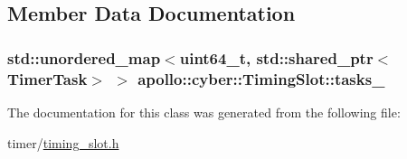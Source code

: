 \subsection{Member Data Documentation}
\hypertarget{classapollo_1_1cyber_1_1TimingSlot_a2cdde7cc5a017a2cd2816676133864e7}{
\subsubsection[{tasks\-\_\-}]{\setlength{\rightskip}{0pt plus 5cm}std\-::unordered\-\_\-map$<$uint64\-\_\-t, std\-::shared\-\_\-ptr$<${\bf Timer\-Task}$>$ $>$ apollo\-::cyber\-::\-Timing\-Slot\-::tasks\-\_\-\hspace{0.3cm}{\ttfamily [private]}}}\label{classapollo_1_1cyber_1_1TimingSlot_a2cdde7cc5a017a2cd2816676133864e7}


The documentation for this class was generated from the following file\-:\begin{DoxyCompactItemize}
\item 
timer/\hyperlink{timing__slot_8h}{timing\-\_\-slot.\-h}\end{DoxyCompactItemize}
